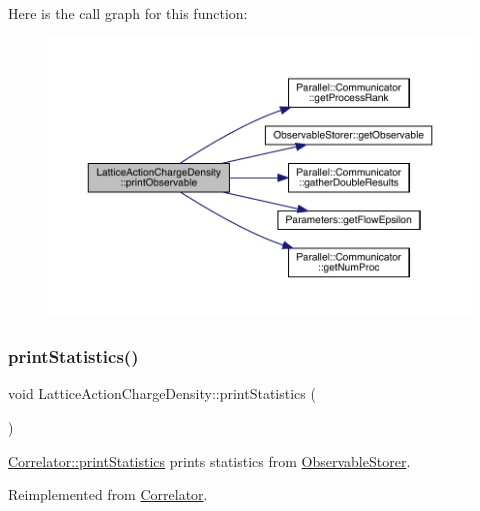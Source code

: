 Here is the call graph for this function\+:
\nopagebreak
\begin{figure}[H]
\begin{center}
\leavevmode
\includegraphics[width=350pt]{class_lattice_action_charge_density_abb7db718d4069faab0ed19f31aa85ad4_cgraph}
\end{center}
\end{figure}
\mbox{\label{class_lattice_action_charge_density_abdaa497dd70dee58b810de7315241a56}} 
\subsubsection{\texorpdfstring{printStatistics()}{printStatistics()}}
{\footnotesize\ttfamily void Lattice\+Action\+Charge\+Density\+::print\+Statistics (\begin{DoxyParamCaption}{ }\end{DoxyParamCaption})\hspace{0.3cm}{\ttfamily [virtual]}}



\mbox{\hyperlink{class_correlator_a2168d677f547769784781d2e2aaa53cf}{Correlator\+::print\+Statistics}} prints statistics from \mbox{\hyperlink{class_observable_storer}{Observable\+Storer}}. 



Reimplemented from \mbox{\hyperlink{class_correlator_a2168d677f547769784781d2e2aaa53cf}{Correlator}}.

